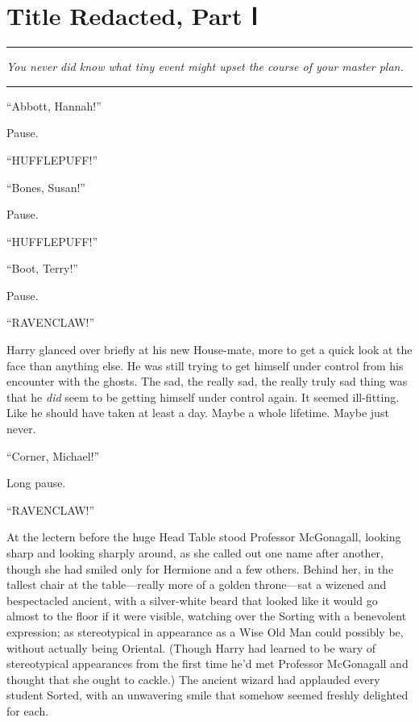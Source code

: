 \chapter{Title Redacted, Part Ⅰ}

\begin{center}\rule{3in}{0.4pt}\end{center}

\emph{You never did know what tiny event might upset the course of your
master plan.}

\begin{center}\rule{3in}{0.4pt}\end{center}

``Abbott, Hannah!''

Pause.

``HUFFLEPUFF!''

``Bones, Susan!''

Pause.

``HUFFLEPUFF!''

``Boot, Terry!''

Pause.

``RAVENCLAW!''

Harry glanced over briefly at his new House-mate, more to get a quick
look at the face than anything else. He was still trying to get himself
under control from his encounter with the ghosts. The sad, the really
sad, the really truly sad thing was that he \emph{did} seem to be
getting himself under control again. It seemed ill-fitting. Like he
should have taken at least a day. Maybe a whole lifetime. Maybe just
never.

``Corner, Michael!''

Long pause.

``RAVENCLAW!''

At the lectern before the huge Head Table stood Professor McGonagall,
looking sharp and looking sharply around, as she called out one name
after another, though she had smiled only for Hermione and a few others.
Behind her, in the tallest chair at the table---really more of a golden
throne---sat a wizened and bespectacled ancient, with a silver-white
beard that looked like it would go almost to the floor if it were
visible, watching over the Sorting with a benevolent expression; as
stereotypical in appearance as a Wise Old Man could possibly be, without
actually being Oriental. (Though Harry had learned to be wary of
stereotypical appearances from the first time he'd met Professor
McGonagall and thought that she ought to cackle.) The ancient wizard had
applauded every student Sorted, with an unwavering smile that somehow
seemed freshly delighted for each.

